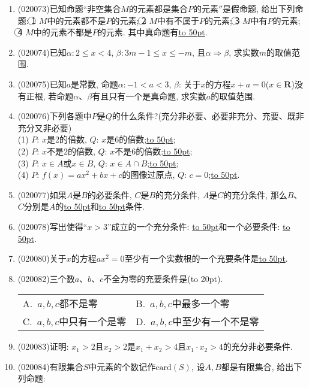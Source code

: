 \documentclass[10pt,a4paper]{article}
\newcommand{\blank}[1]{\underline{\hbox to #1pt{}}}
\newcommand{\bracket}[1]{(\hbox to #1pt{})}
\newcommand{\twoch}[4]{\par\begin{tabular}{p{.46\textwidth}p{.46\textwidth}}
A.~#1& B.~#2\\
C.~#3& D.~#4
\end{tabular}}
\begin{document}
\begin{enumerate}[1.]
(17) 若$x\in \mathbf{R}$, 则方程$x^2-x+1=0$不成立;\blank{50};\\
(18) 若$A\cap B\ne \varnothing$, $B\subset C$, 则$A\cap C\ne \varnothing$;\blank{50};\\
(19) 存在一个三角形, 它的任意两边的平方和小于第三边的平方;\blank{50};\\
(20) 对于任意一个三角形, 存在一组两边的平方和不等于第三边的平方;\blank{50}.
\item {\tiny (020073)}已知命题``非空集合$M$的元素都是集合$P$的元素$''$是假命题, 给出下列命题: \textcircled{1} $M$中的元素都不是$P$的元素; \textcircled{2} $M$中有不属于$P$的元素; \textcircled{3} $M$中有$P$的元素; \textcircled{4} $M$中的元素不都是$P$的元素. 其中真命题有\blank{50}.
\item {\tiny (020074)}已知$\alpha: 2\le x<4$, $\beta: 3m-1\le x\le-m$, 且$\alpha\Rightarrow\beta$, 求实数$m$的取值范围.
\item {\tiny (020075)}已知$a$是常数, 命题$\alpha :-1<a<3$, $\beta$: 关于$x$的方程$x+a=0$($x\in \mathbf{R}$)没有正根, 若命题$\alpha$、$\beta$有且只有一个是真命题, 求实数$a$的取值范围.
\item {\tiny (020076)}下列各题中$P$是$Q$的什么条件?(充分非必要、必要非充分、充要、既非充分又非必要)\\
(1) $P$: $x$是$2$的倍数, $Q$: $x$是$6$的倍数;\blank{50};\\
(2) $P$: $x$不是$2$的倍数, $Q$: $x$不是$6$的倍数;\blank{50};\\
(3) $P$: $x\in A$或$x\in B$, $Q$: $x\in A\cap B$;\blank{50};\\
(4) $P$: $f(x)=ax^2+bx+c$的图像过原点, $Q$: $c=0$;\blank{50}.
\item {\tiny (020077)}如果$A$是$B$的必要条件, $C$是$B$的充分条件, $A$是$C$的充分条件, 那么$B$、$C$分别是$A$的\blank{50}和\blank{50}条件.
\item {\tiny (020078)}写出使得``$x>3$''成立的一个充分条件: \blank{50}和一个必要条件: \blank{50}.
\item {\tiny (020080)}关于$x$的方程$ax^2=0$至少有一个实数根的一个充要条件是\blank{50}.
\item {\tiny (020082)}三个数$a$、$b$、$c$不全为零的充要条件是\bracket{20}.
\twoch{$a,b,c$都不是零}{$a,b,c$中最多一个零}{$a,b,c$中只有一个是零}{$a,b,c$中至少有一个不是零}
\item {\tiny (020083)}证明: $x_1>2$且$x_2>2$是$x_1+x_2>4$且$x_1\cdot x_2>4$的充分非必要条件.
\item {\tiny (020084)}有限集合$S$中元素的个数记作$\mathrm{card}(S)$, 设$A,B$都是有限集合, 给出下列命题:\\

\end{enumerate}
\end{document}
